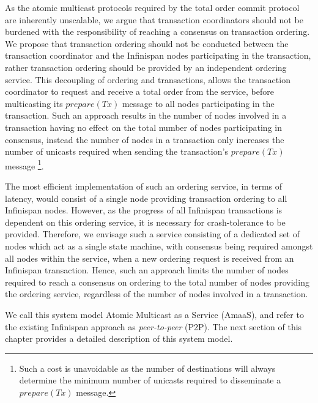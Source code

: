 As the atomic multicast protocols required by the total order commit protocol are inherently unscalable, we argue that transaction coordinators should not be burdened with the responsibility of reaching a consensus on transaction ordering.  We propose that transaction ordering should not be conducted between the transaction coordinator and the Infinispan nodes participating in the transaction, rather transaction ordering should be provided by an independent ordering service.  This decoupling of ordering and transactions, allows the transaction coordinator to request and receive a total order from the service, before multicasting its $prepare(Tx)$ message to all nodes participating in the transaction.  Such an approach results in the number of nodes involved in a transaction having no effect on the total number of nodes participating in consensus, instead the number of nodes in a transaction only increases the number of unicasts required when sending the transaction's $prepare(Tx)$ message \footnote{Such a cost is unavoidable as the number of destinations will always determine the minimum number of unicasts required to disseminate a $prepare(Tx)$ message.}.  

The most efficient implementation of such an ordering service, in terms of latency, would consist of a single node providing transaction ordering to all Infinispan nodes.  However, as the progress of all Infinispan transactions is dependent on this ordering service, it is necessary for crash-tolerance to be provided.  Therefore, we envisage such a service consisting of a dedicated set of nodes which act as a single state machine, with consensus being required amongst all nodes within the service, when a new ordering request is received from an Infinispan transaction.  Hence, such an approach limits the number of nodes required to reach a consensus on ordering to the total number of nodes providing the ordering service, regardless of the number of nodes involved in a transaction.  

We call this system model Atomic Multicast as a Service (\textsf{AmaaS}), and refer to the existing Infinispan approach as \emph{peer-to-peer} (P2P).  The next section of this chapter provides a detailed description of this system model.   

